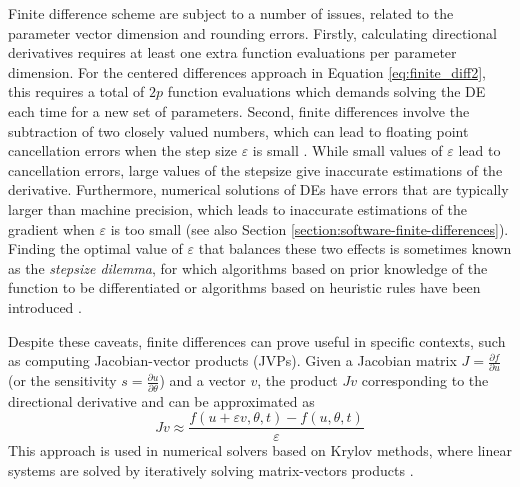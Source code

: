 Finite difference scheme are subject to a number of issues, related to the parameter vector dimension and rounding errors.
Firstly, calculating directional derivatives requires at least one extra function evaluations per parameter dimension.
For the centered differences approach in Equation \eqref{eq:finite_diff2}, this requires a total of $2p$ function evaluations which demands solving the DE each time for a new set of parameters.
Second, finite differences involve the subtraction of two closely valued numbers, which can lead to floating point cancellation errors when the step size $\varepsilon$ is small \cite{Goldberg_1991_floatingpoint}. 
While small values of $\varepsilon$ lead to cancellation errors, large values of the stepsize give inaccurate estimations of the derivative. 
Furthermore, numerical solutions of DEs have errors that are typically larger than machine precision, which leads to inaccurate estimations of the gradient when $\varepsilon$ is too small (see also Section \ref{section:software-finite-differences}).
Finding the optimal value of $\varepsilon$ that balances these two effects is sometimes known as the \textit{stepsize dilemma}, for which algorithms based on prior knowledge of the function to be differentiated or algorithms based on heuristic rules have been introduced \cite{mathur2012stepsize-finitediff, BARTON_1992_finite_diff, SUNDIALS-hindmarsh2005sundials}. 

Despite these caveats, finite differences can prove useful in specific contexts, such as computing Jacobian-vector products (JVPs). 
Given a Jacobian matrix $J = \frac{\partial f}{\partial u}$ (or the sensitivity $s = \frac{\partial u}{\partial \theta}$) and a vector $v$, the product $Jv$ corresponding to the directional derivative and can be approximated as 
\begin{equation}
    Jv \approx \frac{f(u + \varepsilon v, \theta, t) - f(u, \theta, t)}{\varepsilon}
\end{equation}
This approach is used in numerical solvers based on Krylov methods, where linear systems are solved by iteratively solving matrix-vectors products \cite{Ipsen_Meyer_1998}.

